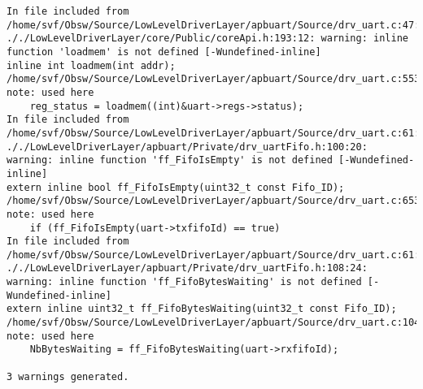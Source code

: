 
\noindent\begin{minipage}{\textwidth}
\begin{lstlisting}[language={}, caption=7th warning example., label=srciror_7]
In file included from /home/svf/Obsw/Source/LowLevelDriverLayer/apbuart/Source/drv_uart.c:47: ././LowLevelDriverLayer/core/Public/coreApi.h:193:12: warning: inline function 'loadmem' is not defined [-Wundefined-inline]
inline int loadmem(int addr); /home/svf/Obsw/Source/LowLevelDriverLayer/apbuart/Source/drv_uart.c:553:18: note: used here
	reg_status = loadmem((int)&uart->regs->status);
In file included from /home/svf/Obsw/Source/LowLevelDriverLayer/apbuart/Source/drv_uart.c:61: ././LowLevelDriverLayer/apbuart/Private/drv_uartFifo.h:100:20: warning: inline function 'ff_FifoIsEmpty' is not defined [-Wundefined-inline]
extern inline bool ff_FifoIsEmpty(uint32_t const Fifo_ID); /home/svf/Obsw/Source/LowLevelDriverLayer/apbuart/Source/drv_uart.c:653:13: note: used here
	if (ff_FifoIsEmpty(uart->txfifoId) == true)
In file included from /home/svf/Obsw/Source/LowLevelDriverLayer/apbuart/Source/drv_uart.c:61: ././LowLevelDriverLayer/apbuart/Private/drv_uartFifo.h:108:24: warning: inline function 'ff_FifoBytesWaiting' is not defined [-Wundefined-inline]
extern inline uint32_t ff_FifoBytesWaiting(uint32_t const Fifo_ID); /home/svf/Obsw/Source/LowLevelDriverLayer/apbuart/Source/drv_uart.c:1047:30: note: used here
	NbBytesWaiting = ff_FifoBytesWaiting(uart->rxfifoId); 

3 warnings generated.
\end{lstlisting}
\end{minipage}